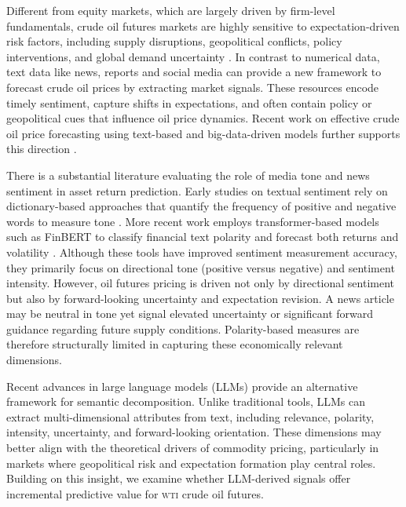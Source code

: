 \documentclass[preprint,12pt,authoryear]{elsarticle}
\newcommand{\wti}{\textsc{wti}}
\newcommand{\finbert}{FinBERT }
\begin{document}


Different from equity markets, which are largely driven by firm-level fundamentals, crude oil futures markets are highly sensitive to expectation-driven risk factors, including supply disruptions, geopolitical conflicts, policy interventions, and global demand uncertainty \citep{ames_which_2020}. 
In contrast to numerical data, text data like news, reports and social media can provide a new framework to forecast crude oil prices by extracting market signals. These resources encode timely sentiment, capture shifts in expectations, and often contain policy or geopolitical cues that influence oil price dynamics. Recent work on effective crude oil price forecasting using text-based and big-data-driven models further supports this direction \citep{wu2021effective}.




There is a substantial literature evaluating the role of media tone and news sentiment in asset return prediction. Early studies on textual sentiment rely on dictionary-based approaches that quantify the frequency of positive and negative words to measure tone \citep{tetlock_giving_2007,chen2018ntusd}. More recent work employs transformer-based models such as \finbert to classify financial text polarity \citep{yahia2024impact}and forecast both returns and volatility \citep{li2024novel}. Although these tools have improved sentiment measurement accuracy, they primarily focus on directional tone (positive versus negative) and sentiment intensity. However, oil futures pricing is driven not only by directional sentiment but also by forward-looking uncertainty and expectation revision. A news article may be neutral in tone yet signal elevated uncertainty or significant forward guidance regarding future supply conditions. Polarity-based measures are therefore structurally limited in capturing these economically relevant dimensions.


Recent advances in large language models (LLMs) provide an alternative framework for semantic decomposition. Unlike traditional tools, LLMs can extract multi-dimensional attributes from text, including relevance, polarity, intensity, uncertainty, and forward-looking orientation. These dimensions may better align with the theoretical drivers of commodity pricing, \citep{kim2023llms,wang2025novel,jeong2025energy} particularly in markets where geopolitical risk and expectation formation play central roles. Building on this insight, we examine whether LLM-derived signals offer incremental predictive value for \wti{} crude oil futures.  
\end{document}
